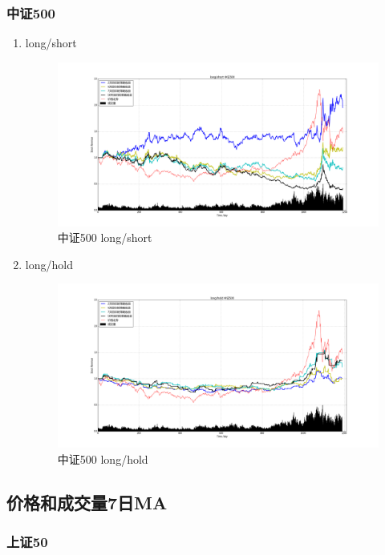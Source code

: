 \documentclass[12pt,a4paper]{article}
\begin{document}
\subsubsection{中证500}
\begin{enumerate}
\item long/short 
\begin{figure}[H]
	\centering
	\includegraphics[width=1.0\textwidth]{img_r_5/zz500.png}
	\caption{中证500 long/short }
\end{figure}
\item long/hold 
\begin{figure}[H]
	\centering
	\includegraphics[width=1.0\textwidth]{img_r_1/zz500_1.png}
	\caption{中证500 long/hold}
\end{figure}
\end{enumerate}


\subsection{价格和成交量7日MA}
\subsubsection{上证50}
\end{document}

